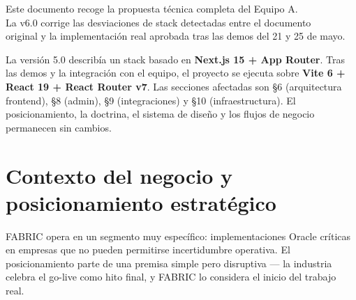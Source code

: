 \documentclass[11pt, a4paper]{article}
\begin{document}
\begin{titlepage}
\vspace{3cm}

\begin{center}
\end{center}

\vspace{0.8cm}

\begin{center}
  {\small\color{textsec}
  Este documento recoge la propuesta técnica completa del Equipo A.\\
  La v6.0 corrige las desviaciones de stack detectadas entre el documento\\
  original y la implementación real aprobada tras las demos del 21 y 25 de mayo.
  }
\end{center}

\end{titlepage}

\pagecolor{white}
\color{black}


\begin{notatec}
La versión 5.0 describía un stack basado en \textbf{Next.js 15 + App Router}.
Tras las demos y la integración con el equipo, el proyecto se ejecuta sobre
\textbf{Vite 6 + React 19 + React Router v7}. Las secciones afectadas son
§6 (arquitectura frontend), §8 (admin), §9 (integraciones) y §10 (infraestructura).
El posicionamiento, la doctrina, el sistema de diseño y los flujos de negocio
permanecen sin cambios.
\end{notatec}

\vspace{1em}


\tableofcontents
\newpage


\section{Contexto del negocio y posicionamiento estratégico}

FABRIC opera en un segmento muy específico: implementaciones Oracle críticas en empresas
que no pueden permitirse incertidumbre operativa. El posicionamiento parte de una premisa
simple pero disruptiva — la industria celebra el go-live como hito final, y FABRIC lo
considera el inicio del trabajo real.
\end{document}
